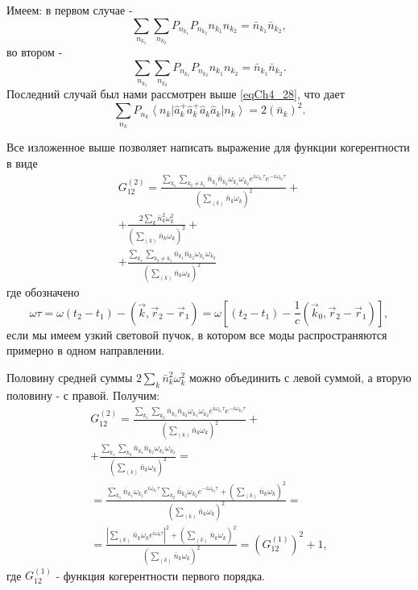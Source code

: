 Имеем: в первом случае -
\begin{equation}
\sum_{n_{k_1}}\sum_{n_{k_2}} P_{n_{k_1}} P_{n_{k_2}} 
n_{k_1} n_{k_2} = \bar{n}_{k_1} \bar{n}_{k_2},
\label{eqCh4_34}
\end{equation}
во втором -
\begin{equation}
\sum_{n_{k_1}}\sum_{n_{k_2}} P_{n_{k_1}} P_{n_{k_2}} 
n_{k_1} n_{k_2} = \bar{n}_{k_1} \bar{n}_{k_2}.
\label{eqCh4_35}
\end{equation}
Последний случай был нами рассмотрен выше \eqref{eqCh4_28}, что дает
\begin{equation}
\sum_{n_{k}} P_{n_{k}}
\left<n_k\right|\hat{a}_k^{+}\hat{a}_k^{+}\hat{a}_k\hat{a}_k\left|n_k\right>
= 2 \left(\bar{n}_k\right)^2.
\label{eqCh4_36}
\end{equation}

Все изложенное выше позволяет написать выражение для функции
когерентности в виде 
\begin{eqnarray}
G_{12}^{(2)} = \frac{\sum_{k_1}\sum_{k_2 \neq k_1} \bar{n}_{k_1}
  \bar{n}_{k_2} \omega_{k_1} \omega_{k_2} e^{i \omega_{k_1} \tau} 
e^{- i \omega_{k_2} \tau} } 
{\left(\sum_{(k)} \bar{n}_k \omega_k\right)^2} + 
\nonumber \\
+
\frac{2 \sum_{k} \bar{n}_{k}^2 \omega_k^2} 
{\left(\sum_{(k)} \bar{n}_k \omega_k\right)^2} + 
\nonumber \\
+
\frac{\sum_{k_1}\sum_{k_2 \neq k_1} \bar{n}_{k_1}
  \bar{n}_{k_2} \omega_{k_1} \omega_{k_2}} 
{\left(\sum_{(k)} \bar{n}_k \omega_k\right)^2}
\label{eqCh4_37}
\end{eqnarray}
где обозначено 
\[
\omega \tau = \omega \left(t_2 - t_1\right) - \left(\vec{k}, \vec{r}_2
- \vec{r}_1\right) = 
\omega \left[
\left(t_2 - t_1\right) - \frac{1}{c}\left(\vec{k}_0, \vec{r}_2
- \vec{r}_1\right)
\right],
\]
если мы имеем узкий световой пучок, в котором все моды
распространяются примерно в одном направлении. 

Половину средней суммы $2 \sum_{k} \bar{n}_{k}^2 \omega_k^2$ можно
объединить с левой суммой, а вторую половину - с правой. Получим: 
\begin{eqnarray}
G_{12}^{(2)} = \frac{\sum_{k_1}\sum_{k_2} \bar{n}_{k_1}
  \bar{n}_{k_2} \omega_{k_1} \omega_{k_2} e^{i \omega_{k_1} \tau} 
e^{- i \omega_{k_2} \tau}} 
{\left(\sum_{(k)} \bar{n}_k \omega_k\right)^2} + 
\nonumber \\
+ \frac{\sum_{k_1}\sum_{k_2} \bar{n}_{k_1}
  \bar{n}_{k_2} \omega_{k_1} \omega_{k_2}} 
{\left(\sum_{(k)} \bar{n}_k \omega_k\right)^2} = 
\nonumber \\
= 
\frac{\sum_{k_1}\bar{n}_{k_1} \omega_{k_1} e^{i \omega_{k_1} \tau}
\sum_{k_2}\bar{n}_{k_2} \omega_{k_2} e^{- i \omega_{k_2} \tau} +
\left(\sum_{(k)} \bar{n}_k \omega_k\right)^2
}
{\left(\sum_{(k)} \bar{n}_k \omega_k\right)^2} = 
\nonumber \\
= \frac{\left|\sum_{(k)}\bar{n}_{k} \omega_{k} e^{i \omega_{k}
  \tau}\right|^2 + \left(\sum_{(k)} \bar{n}_k \omega_k\right)^2}
{\left(\sum_{(k)} \bar{n}_k \omega_k\right)^2} = 
\left(G_{12}^{(1)}\right)^2 + 1,
\label{eqCh4_38}
\end{eqnarray}
где $G_{12}^{(1)}$ - функция когерентности
первого порядка.  

